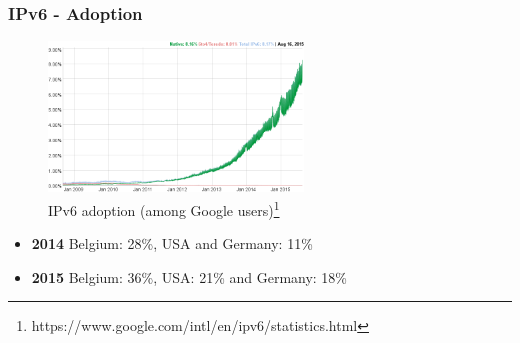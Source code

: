   \begin{frame}
    \frametitle{IPv6 - Adoption}
    \begin{figure}[t]
      \centering
      \includegraphics[height=4cm]{./imgs/2015-08-18-IPv6-adoption.png}
      \caption{IPv6 adoption (among Google users)\footnote{https://www.google.com/intl/en/ipv6/statistics.html}}
      \label{fig:ipv6-adoption}
    \end{figure}
    \begin{itemize}
        \item \textbf{2014} Belgium: 28\%, USA and Germany: 11\%
        \item \textbf{2015} Belgium: 36\%, USA: 21\% and Germany: 18\%
    \end{itemize}
  \end{frame}
